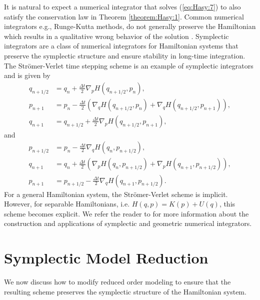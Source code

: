 \documentclass[final]{siamart}
\begin{document}
{{\color{black}} It is natural to expect a numerical integrator that solves (\ref{eq:Hasy:7}) to also satisfy the conservation law in Theorem \ref{theorem:Hasy:1}. Common numerical integrators e.g., Runge-Kutta methods, do not generally preserve the Hamiltonian which results in a qualitative wrong behavior of the solution \cite{Hairer:1250576}. Symplectic integrators are a class of numerical integrators for Hamiltonian systems that preserve the symplectic structure and ensure stability in long-time integration.} The Str\"omer-Verlet time stepping scheme is an example of symplectic integrators and is given by
\begin{equation} \label{eq:Hasy:13}
\begin{aligned}
	q_{n+1/2} &= q_n + \frac{\Delta t}{2} \nabla_pH(q_{n+1/2},p_n), \\
	p_{n+1} &= p_n - \frac{\Delta t}{2} \left( \nabla_qH(q_{n+1/2},p_n) + \nabla_qH(q_{n+1/2},p_{n+1}) \right),\\
	q_{n+1} &= q_{n+1/2} + \frac{\Delta t}{2} \nabla_pH(q_{n+1/2},p_{n+1}),
\end{aligned}
\end{equation}
and
\begin{equation} \label{eq:Hasy:14}
\begin{aligned}
	p_{n+1/2} &= p_n - \frac{\Delta t}{2} \nabla_qH(q_{n},p_{n+1/2}), \\
	q_{n+1} &= q_n + \frac{\Delta t}{2} \left( \nabla_pH(q_{n},p_{n+1/2}) + \nabla_pH(q_{n+1},p_{n+1/2}) \right),\\
	p_{n+1} &= p_{n+1/2} - \frac{\Delta t}{2} \nabla_qH(q_{n+1},p_{n+1/2}).
\end{aligned}
\end{equation}
For a general Hamiltonian system, the Str\"omer-Verlet scheme is implicit. However, for separable Hamiltonians, i.e. $H(q,p) = K(p) + U(q)$, this {{\color{black}} scheme becomes} explicit. We refer the reader to \cite{Hairer:1250576} for more information about the construction and applications of symplectic and geometric numerical integrators. 

\section{Symplectic Model Reduction} \label{chap:SyMo:1}
We now {{\color{black}} discuss} how to modify reduced order modeling to ensure that {{\color{black}} the resulting scheme preserves} the symplectic structure of the Hamiltonian system. 
\end{document}

